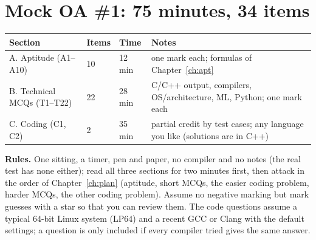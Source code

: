 \documentclass[10pt,a4paper,openany,oneside]{report}
\newcommand{\prio}[1]{\texorpdfstring{\ifcase#1\or{\color{gold}\ding{72}}\or{\color{gold}\ding{72}\ding{72}}\or{\color{gold}\ding{72}\ding{72}\ding{72}}\fi}{}}
\begin{document}
\section{Mock OA \#1: 75 minutes, 34 items \prio{3}}\label{sec:mockoa}
\newcommand{\tqhead}[2]{\par\medskip\Needspace*{7\baselineskip}\noindent\textbf{\color{qviolet}#1.}\ #2\par\nopagebreak}
\newcommand{\tqopts}[4]{\noindent\hspace*{1.4em}\textbf{(A)}~#1\qquad\textbf{(B)}~#2\qquad\textbf{(C)}~#3\qquad\textbf{(D)}~#4\par}
\begin{center}\small
\begin{xltabular}{\textwidth}{@{}L{4.2cm}L{1.6cm}L{1.8cm}Y@{}}
\toprule
\textbf{Section} & \textbf{Items} & \textbf{Time} & \textbf{Notes}\\
\midrule\endhead
A. Aptitude (A1--A10) & 10 & 12 min & one mark each; formulas of Chapter~\ref{ch:apt}\\
B. Technical MCQs (T1--T22) & 22 & 28 min & C/C++ output, compilers, OS/architecture, ML, Python; one mark each\\
C. Coding (C1, C2) & 2 & 35 min & partial credit by test cases; any language you like (solutions are in C++)\\
\bottomrule
\end{xltabular}
\end{center}
\textbf{Rules.} One sitting, a timer, pen and paper, no compiler and no notes (the real test has none either); read all three sections for two minutes first, then attack in the order of Chapter~\ref{ch:plan} (aptitude, short MCQs, the easier coding problem, harder MCQs, the other coding problem). Assume no negative marking but mark guesses with a star so that you can review them. The code questions assume a typical 64-bit Linux system (LP64) and a recent GCC or Clang with the default settings; a question is only included if every compiler tried gives the same answer.
\end{document}
